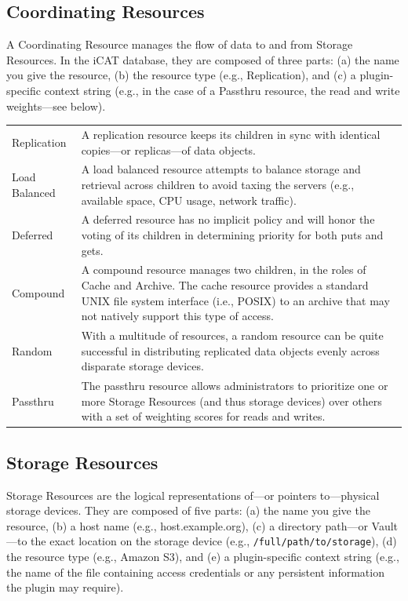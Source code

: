\documentclass[10pt,oneside]{memoir}
\begin{document}
\subsection{Coordinating Resources}
\label{sec:coordinating_resources}

A Coordinating Resource manages the flow of data to and from Storage Resources. In the iCAT database, they are composed of three parts: (a) the name you give the resource, (b) the resource type (e.g., Replication), and (c) a plugin-specific context string (e.g., in the case of a Passthru resource, the read and write weights---see below).

\begin{center}
\def\arraystretch{1.5}%
\begin{tabular}{ |l|p{10cm}| }
\hline
Replication & A replication resource keeps its children in sync with identical copies---or replicas---of data objects. \\
Load Balanced & A load balanced resource attempts to balance storage and retrieval across children to avoid taxing the servers (e.g., available space, CPU usage, network traffic). \\
Deferred & A deferred resource has no implicit policy and will honor the voting of its children in determining priority for both puts and gets. \\
Compound & A compound resource manages two children, in the roles of Cache and Archive. The cache resource provides a standard UNIX file system interface (i.e., POSIX) to an archive that may not natively support this type of access. \\
Random & With a multitude of resources, a random resource can be quite successful in distributing replicated data objects evenly across disparate storage devices. \\
Passthru & The passthru resource allows administrators to prioritize one or more Storage Resources (and thus storage devices) over others with a set of weighting scores for reads and writes. \\
\hline
\end{tabular}
\end{center}

\subsection{Storage Resources}

Storage Resources are the logical representations of---or pointers to---physical storage devices. They are composed of five parts: (a) the name you give the resource, (b) a host name (e.g., host.example.org), (c) a directory path---or Vault---to the exact location on the storage device (e.g., \texttt{/full/path/to/storage}), (d) the resource type (e.g., Amazon S3), and (e) a plugin-specific context string (e.g., the name of the file containing access credentials or any persistent information the plugin may require).
\end{document}
